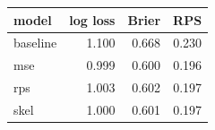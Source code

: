 
\begin{tabular}{lrrr}
\toprule
model & log loss & Brier & RPS\\
\midrule
baseline & 1.100 & 0.668 & 0.230\\
mse & 0.999 & 0.600 & 0.196\\
rps & 1.003 & 0.602 & 0.197\\
skel & 1.000 & 0.601 & 0.197\\
\bottomrule
\end{tabular}
